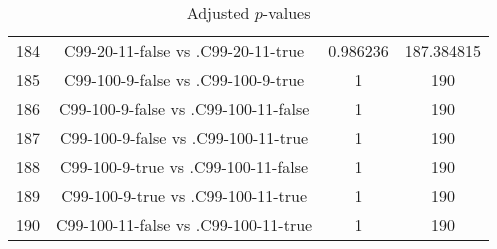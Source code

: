 \documentclass[a4paper,10pt]{article}
\begin{document}
\begin{landscape}
\begin{table}[!htp]
\begin{tabular}{cccc}
184&C99-20-11-false vs .C99-20-11-true&0.986236&187.384815\\
185&C99-100-9-false vs .C99-100-9-true&1&190\\
186&C99-100-9-false vs .C99-100-11-false&1&190\\
187&C99-100-9-false vs .C99-100-11-true&1&190\\
188&C99-100-9-true vs .C99-100-11-false&1&190\\
189&C99-100-9-true vs .C99-100-11-true&1&190\\
190&C99-100-11-false vs .C99-100-11-true&1&190\\
\hline
\end{tabular}
\caption{Adjusted $p$-values}
\end{table}

\end{landscape}
\end{document}
